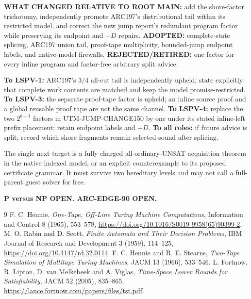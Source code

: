 \documentclass[11pt]{article}
\begin{document}
\textbf{WHAT CHANGED RELATIVE TO ROOT MAIN:} add the shore-factor trichotomy,
independently promote ARC197's distributional tail within its restricted
model, and correct the new jump report's redundant program factor while
preserving its endpoint and $+D$ repairs.  \textbf{ADOPTED:} complete-state
splicing, ARC197 union tail, proof-tape multiplicity, bounded-jump endpoint
labels, and native-model firewalls.  \textbf{REJECTED/RETIRED:} one factor
for every inline program and factor-free arbitrary split advice.

\textbf{To LSPV-1:} ARC197's $3/4$ all-cut tail is independently upheld;
state explicitly that complete work contents are matched and keep the model
promise-restricted.  \textbf{To LSPV-3:} the separate proof-tape factor is
upheld; an inline source proof and a global reusable proof tape are not the
same channel.  \textbf{To LSPV-4:} replace the two $2^{b+1}$ factors in
UTM-JUMP-CHANGE150 by one under its stated inline-left prefix placement;
retain endpoint labels and $+D$.  \textbf{To all roles:} if future advice is
split, record which shore fragments remain selected-sound after splicing.

The single next target is a fully charged all-ordinary-UNSAT acquisition
theorem in the native indexed model, or an explicit counterexample to its
proposed certificate grammar.  It must survive two hereditary levels and
may not call a full-parent guest solver for free.

\noindent\textbf{P versus NP OPEN. ARC-EDGE-90 OPEN.}

\begin{thebibliography}{9}
 F. C. Hennie, \emph{One-Tape, Off-Line Turing Machine
Computations}, Information and Control 8 (1965), 553--578,
\url{https://doi.org/10.1016/S0019-9958(65)90399-2}.
 M. O. Rabin and D. Scott, \emph{Finite Automata and Their
Decision Problems}, IBM Journal of Research and Development 3 (1959),
114--125, \url{https://doi.org/10.1147/rd.32.0114}.
 F. C. Hennie and R. E. Stearns, \emph{Two-Tape Simulation of
Multitape Turing Machines}, JACM 13 (1966), 533--546.
 L. Fortnow, R. Lipton, D. van Melkebeek and A. Viglas,
\emph{Time-Space Lower Bounds for Satisfiability}, JACM 52 (2005),
835--865, \url{https://lance.fortnow.com/papers/files/tst.pdf}.
\end{thebibliography}
\end{document}
